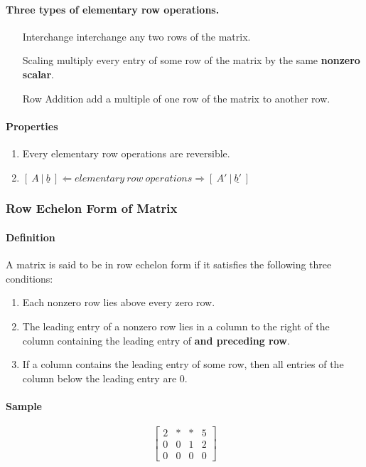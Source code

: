 \documentclass[14pt]{article}
\begin{document}
\begin{CJK}{UTF8}{min}
\paragraph{Three types of elementary row operations.}
\begin{enumerate}
\item[Interchange] interchange any two rows of the matrix.
\item[Scaling] multiply every entry of some row of the matrix by the same \textbf{nonzero scalar}.
\item[Row Addition] add a multiple of one row of the matrix to another row.
\end{enumerate}
\paragraph{Properties}
\begin{enumerate}
\item Every elementary row operations are reversible.
\item $[\ A\ |\ \underline{b}\ ] \Leftarrow elementary\ row\ operations \Rightarrow [\ A'\ |\ \underline{b'}\ ]$
\end{enumerate}

\subsubsection{Row Echelon Form of Matrix}
\paragraph{Definition}
A matrix is said to be in row echelon form if it satisfies the following three conditions:
\begin{enumerate}
\item Each nonzero row lies above every zero row.
\item The leading entry of a nonzero row lies in a column to the right of the column containing the leading entry of \textbf{and preceding row}.
\item If a column contains the leading entry of some row, then all entries of the column below the leading entry are $0$.
\end{enumerate}
\paragraph{Sample}
\begin{equation}
\left[
\begin{array}{cccc}
2 & * & * & 5\\
0 & 0 & 1 & 2\\
0 & 0 & 0 & 0
\end{array}
\right]
\end{equation}


\end{CJK}
\end{document}

